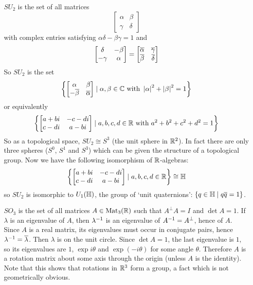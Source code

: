 \begin{exam}
  $SU_2$ is the set of all matrices
  \[
    \begin{bmatrix}
      \alpha & \beta \\ \gamma & \delta
    \end{bmatrix}
  \]
  with complex entries satisfying $\alpha\delta-\beta\gamma=1$ and
  \[
    \begin{bmatrix}
      \delta & -\beta \\ -\gamma & \alpha
    \end{bmatrix}
    =
    \begin{bmatrix}
      \overline\alpha & \overline\gamma \\ \overline\beta & \overline\delta
    \end{bmatrix}
  \]
  So $SU_2$ is the set
  \[\left\{ 
      \begin{bmatrix}
	\alpha & \beta \\ -\overline\beta & \overline\alpha
      \end{bmatrix}
      \mid
      \alpha,\beta \in \mathbb{C} \text{ with } \left\lvert \alpha \right\rvert^2+\left\lvert \beta \right\rvert^2=1
  \right\}\]
  or equivalently
  \[\left\{ 
      \begin{bmatrix}
	a+bi & -c-di \\ c-di & a-bi
      \end{bmatrix}
      \mid
      a,b,c,d \in \mathbb{R} \text{ with } a^2+b^2+c^2+d^2=1
  \right\}\]
  So as a topological space, $SU_2 \cong S^3$ (the unit sphere in $\mathbb{R}^2$).
  In fact there are only three spheres ($S^0$, $S^1$ and $S^3$) which can be given the structure of a topological group.
  Now we have the following isomorphism of $\mathbb{R}$-algebras:
  \[\left\{ 
      \begin{bmatrix}
	a+bi & -c-di \\ c-di & a-bi
      \end{bmatrix}
      \mid
      a,b,c,d \in \mathbb{R}
  \right\}
  \cong \mathbb{H}
  \]
  so $SU_2$ is isomorphic to $U_1(\mathbb{H})$, the group of `unit quaternions': $\{q \in \mathbb{H} \mid q\overline q=1\}$.
\end{exam}

\begin{exam}
  $SO_3$ is the set of all matrices $A \in \operatorname{Mat}_3(\mathbb{R})$ such that $A^\perp A=I$ and $\det A=1$.
  If $\lambda$ is an eigenvalue of $A$, then $\lambda^{-1}$ is an eigenvalue of $A^{-1}=A^\perp$, hence of $A$.
  Since $A$ is a real matrix, its eigenvalues must occur in conjugate pairs, hence $\lambda^{-1}=\overline\lambda$.
  Then $\lambda$ is on the unit circle.
  Since $\det A=1$, the last eigenvalue is $1$, so its eigenvalues are $1$, $\exp i\theta$ and $\exp(-i\theta)$ for some angle $\theta$.
  Therefore $A$ is a rotation matrix about some axis through the origin (unless $A$ is the identity).
  Note that this shows that rotations in $\mathbb{R}^3$ form a group, a fact which is not geometrically obvious.
\end{exam}

